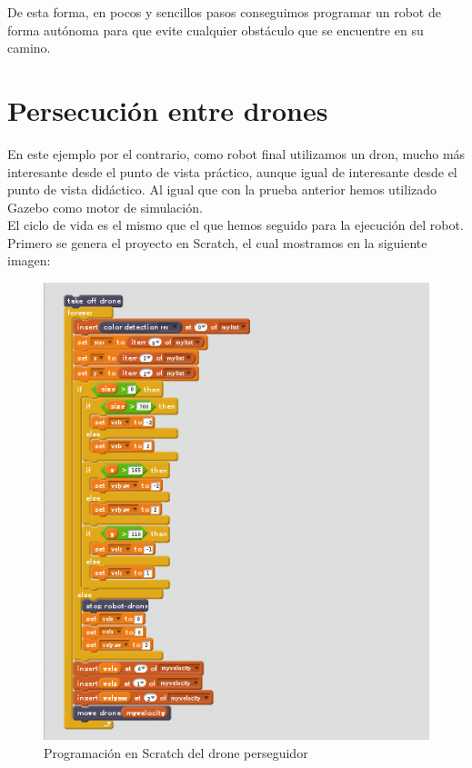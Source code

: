 De esta forma, en pocos y sencillos pasos conseguimos programar un robot de forma autónoma para que evite cualquier obstáculo que se encuentre en su camino.


\section{Persecución entre drones}
\label{sec:persecucion-drones}

En este ejemplo por el contrario, como robot final utilizamos un dron, mucho más interesante desde el punto de vista práctico, aunque igual de interesante desde el punto de vista didáctico. Al igual que con la prueba anterior hemos utilizado Gazebo como motor de simulación.\\

El ciclo de vida es el mismo que el que hemos seguido para la ejecución del robot. Primero se genera el proyecto en Scratch, el cual mostramos en la siguiente imagen:\\

\begin{figure}[H]
    \centering
    \includegraphics[scale=0.75]{img/cat-drone-scratch.PNG}
  	\caption{Programación en Scratch del drone perseguidor}
  	\label{fig:turtlebot}
\end{figure}

